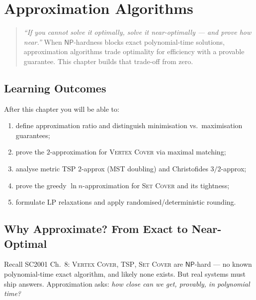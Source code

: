 \chapter{Approximation Algorithms}
\label{ch:approx}

\begin{quote}
\emph{``If you cannot solve it optimally, solve it near-optimally --- and prove how near.''}
When $\mathsf{NP}$-hardness blocks exact polynomial-time solutions, approximation algorithms trade optimality for efficiency with a provable guarantee. This chapter builds that trade-off from zero.
\end{quote}

\noindent{}
\vspace{0.4em}

\section*{Learning Outcomes}
After this chapter you will be able to:
\begin{enumerate}[label=(L\arabic*)]
    \item define approximation ratio and distinguish minimisation vs.\ maximisation guarantees;
    \item prove the $2$-approximation for \textsc{Vertex Cover} via maximal matching;
    \item analyse metric TSP $2$-approx (MST doubling) and Christofides $3/2$-approx;
    \item prove the greedy $\ln n$-approximation for \textsc{Set Cover} and its tightness;
    \item formulate LP relaxations and apply randomised/deterministic rounding.
\end{enumerate}

\section{Why Approximate? From Exact to Near-Optimal}
\label{sec:why-approx}

Recall SC2001 Ch.~8: \textsc{Vertex Cover}, \textsc{TSP}, \textsc{Set Cover} are $\mathsf{NP}$-hard --- no known polynomial-time exact algorithm, and likely none exists. But real systems must ship answers. Approximation asks: \emph{how close can we get, provably, in polynomial time?}

